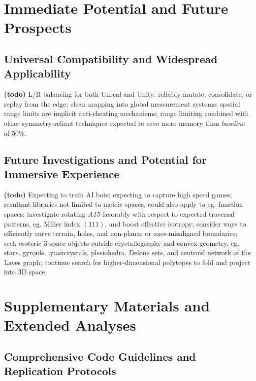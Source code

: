 \documentclass[10pt]{article}
\def\AAAB{\textit{A15}}
\begin{document}
\section{Immediate Potential and Future Prospects}\label{immediate-potential-and-future-prospects}

\subsection{Universal Compatibility and Widespread Applicability}\label{universal-compatibility-and-widespread-applicability}

\textbf{(todo)} L/R balancing for both Unreal and Unity; reliably mutate, consolidate, or replay from the edge; clean mapping
into global measurement systems; spatial range limits are implicit anti-cheating mechanisms; range limiting combined with other
symmetry-reliant techniques expected to save more memory than \emph{baseline} of 50\%.

\subsection{Future Investigations and Potential for Immersive Experience}\label{future-investigations-and-potential-for-immersive-experience}

\textbf{(todo)} Expecting to train AI bots; expecting to capture high speed games; resultant libraries not limited to metric
spaces, could also apply to eg. function spaces; investigate rotating \AAAB{} favorably with respect to expected traversal
patterns, eg. Miller index $(111)$, and boost effective isotropy; consider ways to efficiently carve terrain, holes, and
non-planar or axes-misaligned boundaries; seek esoteric 3-space objects outside crystallography and convex geometry, eg. stars,
gyroids, quasicrystals, plesiohedra, Delone sets, and centroid network of the Laves graph; continue search for higher-dimensional
polytopes to fold and project into 3D space.


\section{Supplementary Materials and Extended Analyses}\label{supplementary-materials-and-extended-analyses}

\subsection{Comprehensive Code Guidelines and Replication Protocols}\label{comprehensive-code-guidelines-and-replication-protocols}
\end{document}
